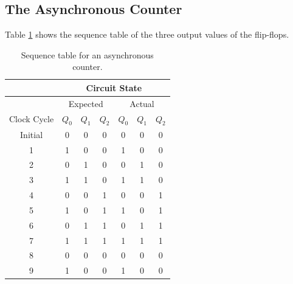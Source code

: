 \documentclass{report}
\begin{document}
	\subsection{The Asynchronous Counter}
	Table \ref{section7} shows the sequence table of the three output values of the flip-flops.
	\begin{table}[h]
		\centering
		\begin{tabular}{@{}c|cccccc@{}}
			\toprule
			\cellcolor[HTML]{000000} & \multicolumn{6}{c}{Circuit State}                                              \\ \midrule
			\cellcolor[HTML]{000000} & \multicolumn{3}{c|}{Expected}                    & \multicolumn{3}{c}{Actual}  \\ \midrule
			Clock Cycle              & $Q_{0}$ & $Q_{1}$ & \multicolumn{1}{c|}{$Q_{2}$} & $Q_{0}$ & $Q_{1}$ & $Q_{2}$ \\ \midrule
			Initial                  & 0       & 0       & \multicolumn{1}{c|}{0}       & 0       & 0       & 0       \\
			1                        & 1       & 0       & \multicolumn{1}{c|}{0}       & 1       & 0       & 0       \\
			2                        & 0       & 1       & \multicolumn{1}{c|}{0}       & 0       & 1       & 0       \\
			3                        & 1       & 1       & \multicolumn{1}{c|}{0}       & 1       & 1       & 0       \\
			4                        & 0       & 0       & \multicolumn{1}{c|}{1}       & 0       & 0       & 1       \\
			5                        & 1       & 0       & \multicolumn{1}{c|}{1}       & 1       & 0       & 1       \\
			6                        & 0       & 1       & \multicolumn{1}{c|}{1}       & 0       & 1       & 1       \\
			7                        & 1       & 1       & \multicolumn{1}{c|}{1}       & 1       & 1       & 1       \\
			8                        & 0       & 0       & \multicolumn{1}{c|}{0}       & 0       & 0       & 0       \\
			9                        & 1       & 0       & \multicolumn{1}{c|}{0}       & 1       & 0       & 0       \\ \bottomrule
		\end{tabular}
		\caption{Sequence table for an asynchronous counter.}
		\label{section7}
	\end{table}
	
\end{document}
